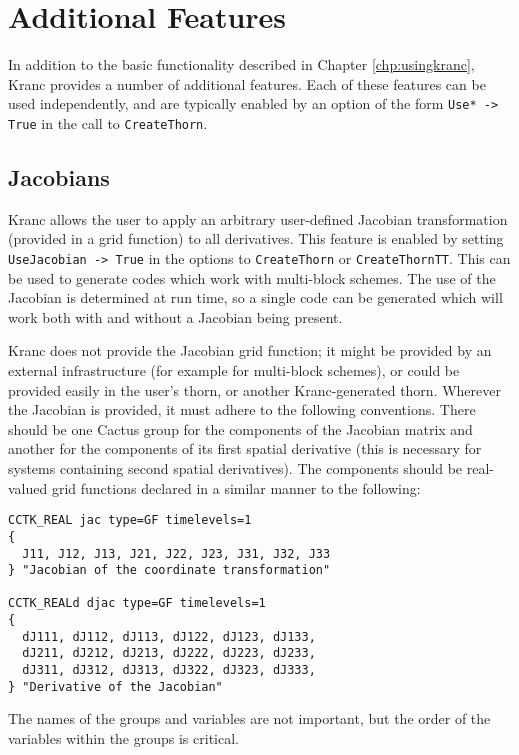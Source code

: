 \documentclass{report}
\begin{document}

\chapter{Additional Features}

In addition to the basic functionality described in Chapter
\ref{chp:usingkranc}, Kranc provides a number of additional features.
Each of these features can be used independently, and are typically
enabled by an option of the form \verb|Use* -> True| in the call to
\verb|CreateThorn|.

\section{Jacobians}

Kranc allows the user to apply an arbitrary user-defined Jacobian
transformation (provided in a grid function) to all derivatives.  This
feature is enabled by setting \verb|UseJacobian -> True| in the
options to \verb|CreateThorn| or \verb|CreateThornTT|.  This can be
used to generate codes which work with multi-block schemes.  The use
of the Jacobian is determined at run time, so a single code can be
generated which will work both with and without a Jacobian being
present.

Kranc does not provide the Jacobian grid function; it might be
provided by an external infrastructure (for example for multi-block
schemes), or could be provided easily in the user's thorn, or another
Kranc-generated thorn.  Wherever the Jacobian is provided, it must
adhere to the following conventions.  There should be one Cactus group
for the components of the Jacobian matrix and another for the
components of its first spatial derivative (this is necessary for
systems containing second spatial derivatives).  The components should
be real-valued grid functions declared in a similar manner to the
following:

\begin{verbatim}
CCTK_REAL jac type=GF timelevels=1
{
  J11, J12, J13, J21, J22, J23, J31, J32, J33
} "Jacobian of the coordinate transformation"

CCTK_REALd djac type=GF timelevels=1
{
  dJ111, dJ112, dJ113, dJ122, dJ123, dJ133,
  dJ211, dJ212, dJ213, dJ222, dJ223, dJ233,
  dJ311, dJ312, dJ313, dJ322, dJ323, dJ333,
} "Derivative of the Jacobian"
\end{verbatim}

The names of the groups and variables are not important, but the order
of the variables within the groups is critical.
\end{document}
